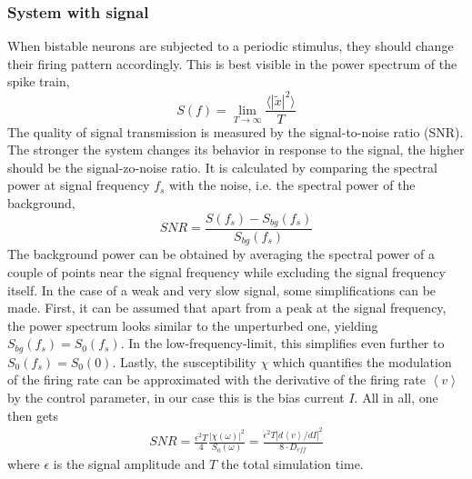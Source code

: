 \documentclass[12pt,a4paper]{article}
\begin{document}
\subsubsection{System with signal}
When bistable neurons are subjected to a periodic stimulus, they should change their firing pattern accordingly. This is best visible in the power spectrum of the spike train, 
\begin{equation}
S(f)=\lim_{T\rightarrow\infty}\frac{\langle|\tilde{x}|^2\rangle}{T}
\end{equation}
The quality of signal transmission is measured by the signal-to-noise ratio (SNR). The stronger the system changes its behavior in response to the signal, the higher should be the signal-zo-noise ratio. It is calculated by comparing the spectral power at signal frequency $f_s$ with the noise, i.e. the spectral power of the background,
\begin{equation}
SNR=\frac{S(f_{s})-S_{bg}(f_{s})}{S_{bg}(f_{s})}
\end{equation}
The background power can be obtained by averaging the spectral power of a couple of points near the signal frequency while excluding the signal frequency itself. In the case of a weak and very slow signal, some simplifications can be made. First, it can be assumed that apart from a peak at the signal frequency, the power spectrum looks similar to the unperturbed one, yielding $S_{bg}(f_s)=S_0(f_s)$. In the low-frequency-limit, this simplifies even further to $S_{0}(f_s)=S_0(0)$. Lastly, the susceptibility $\chi$ which quantifies the modulation of the firing rate can be approximated with the derivative of the firing rate $\left<v\right>$ by the control parameter, in our case this is the bias current $I$. All in all, one then gets
\begin{align}\label{snrweaksig}
SNR=\frac{\epsilon ^2T}{4}\frac{|\chi(\omega)|^2}{S_0(\omega)}=\frac{\epsilon^2T|d\left<v\right>/dI|^2}{8\cdot D_{eff}}
\end{align}
where $\epsilon$ is the signal amplitude and $T$ the total simulation time.
\end{document}
